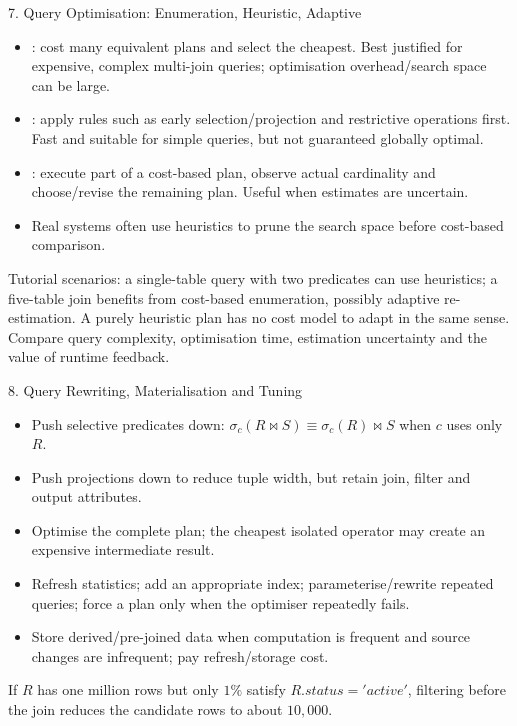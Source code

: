 \begin{topic}{7. Query Optimisation: Enumeration, Heuristic, Adaptive}
\begin{itemize}
  \item {}: cost many equivalent plans and select the cheapest. Best justified for expensive, complex multi-join queries; optimisation overhead/search space can be large.
  \item {}: apply rules such as early selection/projection and restrictive operations first. Fast and suitable for simple queries, but not guaranteed globally optimal.
  \item {}: execute part of a cost-based plan, observe actual cardinality and choose/revise the remaining plan. Useful when estimates are uncertain.
  \item Real systems often use heuristics to prune the search space before cost-based comparison.
\end{itemize}
\worked Tutorial scenarios: a single-table query with two predicates can use heuristics; a five-table join benefits from cost-based enumeration, possibly adaptive re-estimation. A purely heuristic plan has no cost model to adapt in the same sense.
\answer Compare query complexity, optimisation time, estimation uncertainty and the value of runtime feedback.
\end{topic}

\begin{topic}{8. Query Rewriting, Materialisation and Tuning}
\begin{itemize}
  \item Push selective predicates down: \(\sigma_c(R\bowtie S)\equiv\sigma_c(R)\bowtie S\) when \(c\) uses only \(R\).
  \item Push projections down to reduce tuple width, but retain join, filter and output attributes.
  \item Optimise the complete plan; the cheapest isolated operator may create an expensive intermediate result.
  \item Refresh statistics; add an appropriate index; parameterise/rewrite repeated queries; force a plan only when the optimiser repeatedly fails.
  \item Store derived/pre-joined data when computation is frequent and source changes are infrequent; pay refresh/storage cost.
\end{itemize}
\worked If \(R\) has one million rows but only \(1\%\) satisfy \(R.status='active'\), filtering before the join reduces the candidate rows to about \(10{,}000\).
\end{topic}

